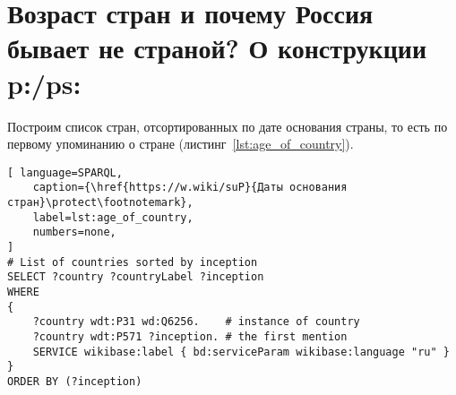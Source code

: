 %
%



\section{Возраст стран и почему Россия бывает не страной? О конструкции p:/ps:}
\label{ch:RussiaNotCountryPPS}



Построим список стран, отсортированных по дате основания страны, то есть по первому упоминанию о стране (листинг~\ref{lst:age_of_country}).

\begin{lstlisting}[ language=SPARQL, 
    caption={\href{https://w.wiki/suP}{Даты основания стран}\protect\footnotemark},
    label=lst:age_of_country, 
    numbers=none,
]
# List of countries sorted by inception 
SELECT ?country ?countryLabel ?inception
WHERE
{
	?country wdt:P31 wd:Q6256.    # instance of country
	?country wdt:P571 ?inception. # the first mention
	SERVICE wikibase:label { bd:serviceParam wikibase:language "ru" }
}
ORDER BY (?inception)
\end{lstlisting}

